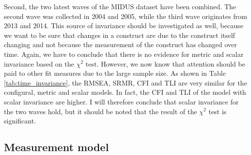 \documentclass[11pt]{article}
\begin{document}
\begin{table}[h]
\captionsetup{singlelinecheck=off}
\caption{Time measurement invariance}
\label{tab:time_invariance}
\end{table}

Second, the two latest waves of the MIDUS dataset have been combined. The second
wave was collected in 2004 and 2005, while the third wave originates from 2013
and 2014. This source of invariance should be investigated as well, because we
want to be sure that changes in a construct are due to the construct itself
changing and not because the measurement of the construct has changed over time.
Again, we have to conclude that there is no evidence for metric and scalar
invariance based on the $\chi^2$ test. However, we now know that attention
should be paid to other fit measures due to the large sample size. As shown in
Table \ref{tab:time_invariance}, the RMSEA, SRMR, CFI and TLI are very similar
for the configural, metric and scalar models. In fact, the  CFI and TLI of the
model with scalar invariance are higher. I will therefore conclude that scalar
invariance for the two waves hold, but it should be noted that the result of the
$\chi^2$ test is significant.

\FloatBarrier\subsection{Measurement model}
\end{document}
